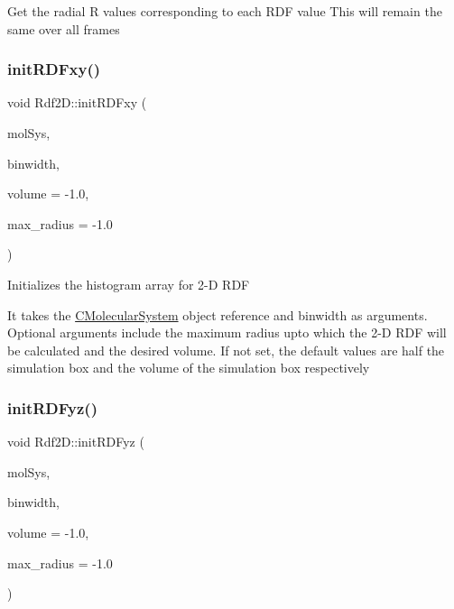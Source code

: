 Get the radial R values corresponding to each R\+DF value This will remain the same over all frames \mbox{\label{classRdf2D_a767f006de6412394a59f1cae5f7f6b35}} 
\subsubsection{\texorpdfstring{init\+R\+D\+Fxy()}{initRDFxy()}}
{\footnotesize\ttfamily void Rdf2\+D\+::init\+R\+D\+Fxy (\begin{DoxyParamCaption}\item[{class \mbox{\hyperlink{classCMolecularSystem}{C\+Molecular\+System}} \&}]{mol\+Sys,  }\item[{double}]{binwidth,  }\item[{double}]{volume = {\ttfamily -\/1.0},  }\item[{double}]{max\+\_\+radius = {\ttfamily -\/1.0} }\end{DoxyParamCaption})}

Initializes the histogram array for 2-\/D R\+DF

It takes the \mbox{\hyperlink{classCMolecularSystem}{C\+Molecular\+System}} object reference and binwidth as arguments. Optional arguments include the maximum radius upto which the 2-\/D R\+DF will be calculated and the desired volume. If not set, the default values are half the simulation box and the volume of the simulation box respectively \mbox{\label{classRdf2D_adf8c5b9d02268de9ee5ebab8cfe7f3df}} 
\subsubsection{\texorpdfstring{init\+R\+D\+Fyz()}{initRDFyz()}}
{\footnotesize\ttfamily void Rdf2\+D\+::init\+R\+D\+Fyz (\begin{DoxyParamCaption}\item[{class \mbox{\hyperlink{classCMolecularSystem}{C\+Molecular\+System}} \&}]{mol\+Sys,  }\item[{double}]{binwidth,  }\item[{double}]{volume = {\ttfamily -\/1.0},  }\item[{double}]{max\+\_\+radius = {\ttfamily -\/1.0} }\end{DoxyParamCaption})}

